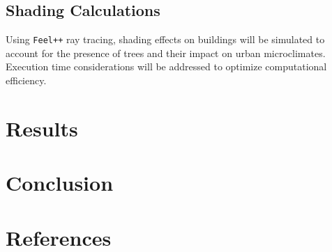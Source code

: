 \documentclass[12pt]{article}
\begin{document}
\subsection{Shading Calculations}
Using \texttt{Feel++} ray tracing, shading effects on buildings will be simulated to account for the presence 
of trees and their impact on urban microclimates. Execution time considerations will be 
addressed to optimize computational efficiency.

\newpage

\section{Results}


\newpage

\section{Conclusion}


\newpage

\section{References}


\end{document}
